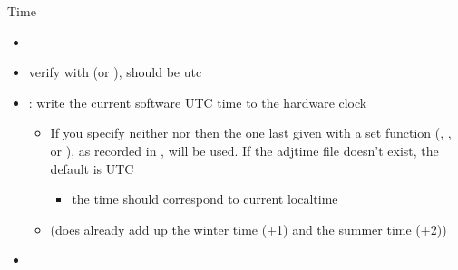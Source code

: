 \begin{frame}{Time}
  \begin{itemize}
    \item {}
    \item verify with  (or ), should be utc
    \item {}: write the current software UTC time to the hardware clock
      \begin{itemize}
        \item If you specify neither  nor  then the one last given with a set function  (, , or ), as recorded in , will be used. If the adjtime file doesn't exist, the default is UTC
          \begin{itemize}
            \item the  time should correspond to current localtime
          \end{itemize}
        \item {} (does already add up the winter time (+1) and the summer time (+2))
      \end{itemize}
    \item {}
  \end{itemize}
\end{frame}

